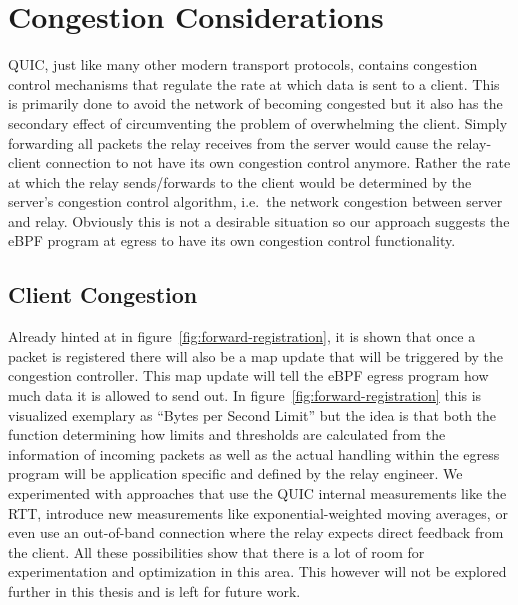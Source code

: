 \section{Congestion Considerations}\label{sec:congestion_considerations}
QUIC, just like many other modern transport protocols, contains congestion 
control mechanisms that regulate the rate at which data is sent to a client.
This is primarily done to avoid the network of becoming congested but it also
has the secondary effect of circumventing the problem of overwhelming the client.
Simply forwarding all packets the relay receives from the server would cause 
the relay-client connection to not have its own congestion control anymore.
Rather the rate at which the relay sends/forwards to the client would be determined
by the server's congestion control algorithm, i.e.~the network congestion between 
server and relay.
Obviously this is not a desirable situation so our approach suggests the eBPF 
program at egress to have its own congestion control functionality.

\subsection{Client Congestion}
Already hinted at in figure~\ref{fig:forward-registration}, it is shown that once a packet is 
registered there will also be a map update that will be triggered by the congestion controller.
This map update will tell the eBPF egress program how much data it is allowed to send out. 
In figure~\ref{fig:forward-registration} this is visualized exemplary as ``Bytes per Second Limit''
but the idea is that both the function determining how limits and thresholds are calculated from 
the information of incoming packets as well as the actual handling within the egress program 
will be application specific and defined by the relay engineer.
We experimented with approaches that use the QUIC internal measurements like the RTT, 
introduce new measurements like exponential-weighted moving averages, or even use an 
out-of-band connection where the relay expects direct feedback from the client.
All these possibilities show that there is a lot of room for experimentation and optimization
in this area.
This however will not be explored further in this thesis and is left for future work.
\\

